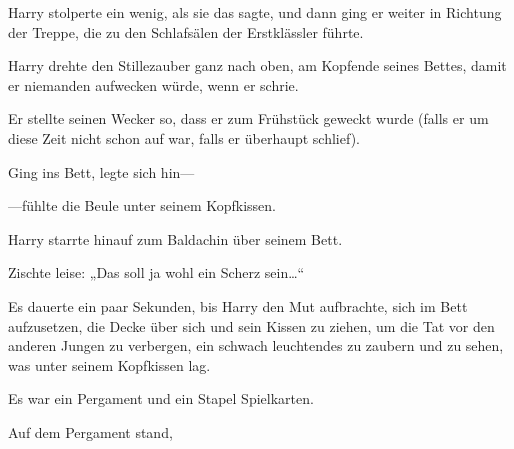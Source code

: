 Harry stolperte ein wenig, als sie das sagte, und dann ging er weiter in Richtung der Treppe, die zu den Schlafsälen der Erstklässler führte.

\later

Harry drehte den Stillezauber ganz nach oben, am Kopfende seines Bettes, damit er niemanden aufwecken würde, wenn er schrie.

Er stellte seinen Wecker so, dass er zum Frühstück geweckt wurde (falls er um diese Zeit nicht schon auf war, falls er überhaupt schlief).

Ging ins Bett, legte sich hin—

—fühlte die Beule unter seinem Kopfkissen.

Harry starrte hinauf zum Baldachin über seinem Bett.

Zischte leise: „Das soll ja wohl ein Scherz sein…“

Es dauerte ein paar Sekunden, bis Harry den Mut aufbrachte, sich im Bett aufzusetzen, die Decke über sich und sein Kissen zu ziehen, um die Tat vor den anderen Jungen zu verbergen, ein schwach leuchtendes  zu zaubern und zu sehen, was unter seinem Kopfkissen lag.

Es war ein Pergament und ein Stapel Spielkarten.

Auf dem Pergament stand,

